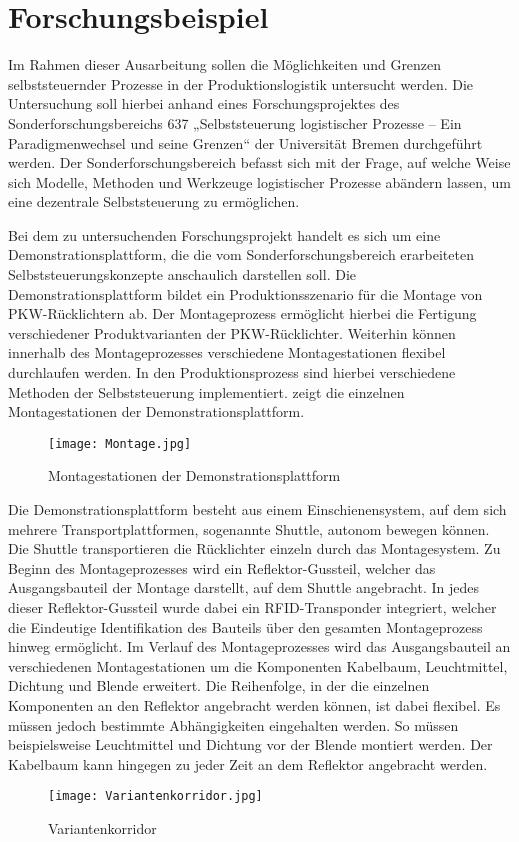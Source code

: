\section{Forschungsbeispiel}
\label{sec:Forschungsbeispiel}

Im Rahmen dieser Ausarbeitung sollen die Möglichkeiten und Grenzen selbststeuernder 
Prozesse in der Produktionslogistik untersucht werden. Die Untersuchung soll hierbei 
anhand eines Forschungsprojektes des Sonderforschungsbereichs 637 „Selbststeuerung 
logistischer Prozesse – Ein Paradigmenwechsel und seine Grenzen“ der Universität 
Bremen durchgeführt werden. Der Sonderforschungsbereich befasst sich mit der Frage, 
auf welche Weise sich Modelle, Methoden und Werkzeuge logistischer Prozesse abändern 
lassen, um eine dezentrale Selbststeuerung zu ermöglichen.

Bei dem zu untersuchenden Forschungsprojekt handelt es sich um eine Demonstrationsplattform, 
die die vom Sonderforschungsbereich erarbeiteten Selbststeuerungskonzepte anschaulich 
darstellen soll. Die Demonstrationsplattform bildet ein Produktionsszenario für die Montage 
von PKW-Rücklichtern ab. Der Montageprozess ermöglicht hierbei die Fertigung verschiedener 
Produktvarianten der PKW-Rücklichter. Weiterhin können innerhalb des Montageprozesses verschiedene 
Montagestationen flexibel durchlaufen werden. In den Produktionsprozess sind hierbei verschiedene 
Methoden der Selbststeuerung implementiert.  zeigt die einzelnen Montagestationen der Demonstrationsplattform.

\begin{figure}[htb] 
\centering
\texttt{[image: Montage.jpg]}
\caption[Montagestation]{Montagestationen der Demonstrationsplattform\protect\footnotemark}
\label{fig:Montagestation}
\end{figure}

Die Demonstrationsplattform besteht aus einem Einschienensystem, auf dem sich mehrere 
Transportplattformen, sogenannte Shuttle, autonom bewegen können. Die Shuttle transportieren 
die Rücklichter einzeln durch das Montagesystem. Zu Beginn des Montageprozesses wird ein 
Reflektor-Gussteil, welcher das Ausgangsbauteil der Montage darstellt, auf dem Shuttle 
angebracht. In jedes dieser Reflektor-Gussteil wurde dabei ein RFID-Transponder integriert, 
welcher die Eindeutige Identifikation des Bauteils über den gesamten Montageprozess hinweg ermöglicht.
Im Verlauf des Montageprozesses wird das Ausgangsbauteil an verschiedenen Montagestationen um die 
Komponenten Kabelbaum, Leuchtmittel, Dichtung und Blende erweitert. Die Reihenfolge, in der die 
einzelnen Komponenten an den Reflektor angebracht werden können, ist dabei flexibel. Es müssen 
jedoch bestimmte Abhängigkeiten eingehalten werden. So müssen beispielsweise Leuchtmittel und 
Dichtung vor der Blende montiert werden. Der Kabelbaum kann hingegen zu jeder Zeit an dem Reflektor angebracht werden.

\begin{figure}[htb] 
\centering
\texttt{[image: Variantenkorridor.jpg]}
\caption[Variantenkorridor]{Variantenkorridor\protect\footnotemark}
\label{fig:Variantenkorridor}
\end{figure}

